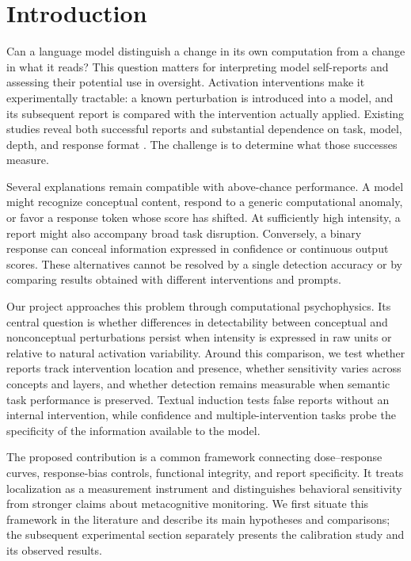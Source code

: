 \section{Introduction}

Can a language model distinguish a change in its own computation from a change in what it reads?
This question matters for interpreting model self-reports and assessing their potential use in oversight.
Activation interventions make it experimentally tractable: a known perturbation is introduced into a model, and its subsequent report is compared with the intervention actually applied.
Existing studies reveal both successful reports and substantial dependence on task, model, depth, and response format \citep{lindsey2026,hahami2026,macar2026}.
The challenge is to determine what those successes measure.

Several explanations remain compatible with above-chance performance.
A model might recognize conceptual content, respond to a generic computational anomaly, or favor a response token whose score has shifted.
At sufficiently high intensity, a report might also accompany broad task disruption.
Conversely, a binary response can conceal information expressed in confidence or continuous output scores.
These alternatives cannot be resolved by a single detection accuracy or by comparing results obtained with different interventions and prompts.

Our project approaches this problem through computational psychophysics.
Its central question is whether differences in detectability between conceptual and nonconceptual perturbations persist when intensity is expressed in raw units or relative to natural activation variability.
Around this comparison, we test whether reports track intervention location and presence, whether sensitivity varies across concepts and layers, and whether detection remains measurable when semantic task performance is preserved.
Textual induction tests false reports without an internal intervention, while confidence and multiple-intervention tasks probe the specificity of the information available to the model.

The proposed contribution is a common framework connecting dose--response curves, response-bias controls, functional integrity, and report specificity.
It treats localization as a measurement instrument and distinguishes behavioral sensitivity from stronger claims about metacognitive monitoring.
We first situate this framework in the literature and describe its main hypotheses and comparisons; the subsequent experimental section separately presents the calibration study and its observed results.

